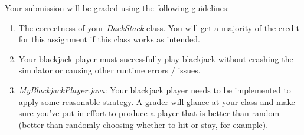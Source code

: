 \documentclass[paper=a4, fontsize=11pt, parskip=full]{scrartcl} %
\numberwithin{equation}{section} %
\numberwithin{figure}{section} %
\numberwithin{table}{section} %
\begin{document}
Your submission will be graded using the following guidelines:

\begin{enumerate}
	\item The correctness of your \emph{DackStack} class. You will get a majority of the credit for this assignment if this class works as intended.
	\item Your blackjack player must successfully play blackjack without crashing the simulator or causing other runtime errors / issues.
	\item \emph{MyBlackjackPlayer.java}: Your blackjack player needs to be implemented to apply some reasonable strategy. A grader will glance at your class and make sure you've put in effort to produce a player that is better than random (better than randomly choosing whether to hit or stay, for example).
\end{enumerate}
\end{document}
